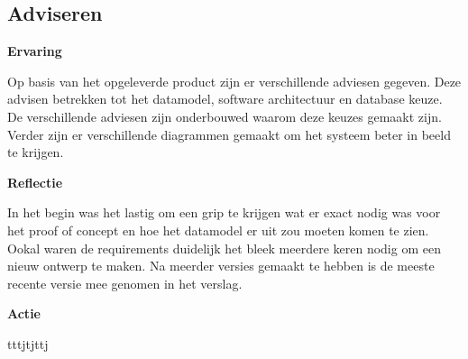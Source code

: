 \subsection{Adviseren}

\textbf{Ervaring}

\whitespace
Op basis van het opgeleverde product zijn er verschillende adviesen gegeven.
Deze advisen betrekken tot het datamodel, software architectuur en database keuze.
De verschillende adviesen zijn onderbouwed waarom deze keuzes gemaakt zijn.
Verder zijn er verschillende diagrammen gemaakt om het systeem beter in beeld te krijgen.

\whitespace
\textbf{Reflectie}

\whitespace
In het begin was het lastig om een grip te krijgen wat er exact nodig was voor het proof of concept en hoe het datamodel er uit zou moeten komen te zien.
Ookal waren de requirements duidelijk het bleek meerdere keren nodig om een nieuw ontwerp te maken.
Na meerder versies gemaakt te hebben is de meeste recente versie mee genomen in het verslag.

\whitespace
\textbf{Actie}

\whitespace
tttjtjttj
